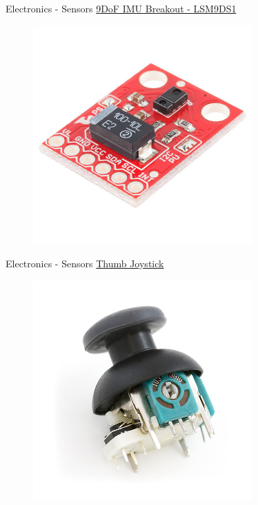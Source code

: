 \documentclass{beamer}
\begin{document}
\begin{frame}{Electronics - Sensors}
    \href{https://www.sparkfun.com/products/13284}{9DoF IMU Breakout - LSM9DS1}
    \begin{figure}[h]
        \includegraphics[width=0.75\textwidth]{rgb.jpg}
    \end{figure}
\end{frame}

\begin{frame}{Electronics - Sensors}
    \href{https://www.sparkfun.com/products/9032}{Thumb Joystick}
    \begin{figure}[h]
        \includegraphics[width=0.75\textwidth]{joystick.jpg}
    \end{figure}
\end{frame}
\end{document}
